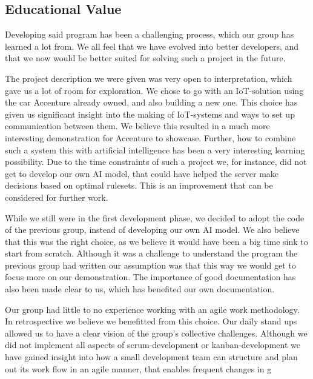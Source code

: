 \subsection{Educational Value}
Developing said program has been a challenging process, which our group has learned a lot from. We all feel that we have evolved into better developers, and that we now would be better suited for solving such a project in the future. 

The project description we were given was very open to interpretation, which gave us a lot of room for exploration. We chose to go with an IoT-solution using the car Accenture already owned, and also building a new one. This choice has given us significant insight into the making of IoT-systems and ways to set up communication between them. We believe this resulted in a much more interesting demonstration for Accenture to showcase. Further, how to combine such a system this with artificial intelligence has been a very interesting learning possibility. Due to the time constraints of such a project we, for instance, did not get to develop our own AI model, that could have helped the server make decisions based on optimal rulesets. This is an improvement that can be considered for further work. 

While we still were in the first development phase, we decided to adopt the code of the previous group, instead of developing our own AI model. We also believe that this was the right choice, as we believe it would have been a big time sink to start from scratch. Although it was a challenge to understand the program the previous group had written our assumption was that this way we would get to focus more on our demonstration. The importance of good documentation has also been made clear to us, which has benefited our own documentation. 

Our group had little to no experience working with an agile work methodology. In retrospective we believe we benefitted from this choice. Our daily stand ups allowed us to have a clear vision of the group's collective challenges. Although we did not implement all aspects of scrum-development or kanban-development we have gained insight into how a small development team can structure and plan out its work flow in an agile manner, that enables frequent changes in g